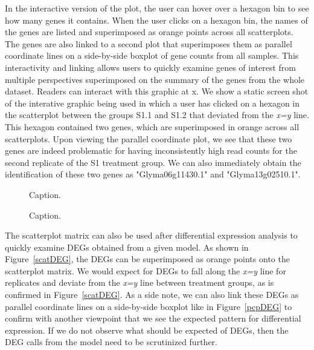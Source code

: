 \documentclass[useAMS,referee]{biom}
\begin{document}
In the interactive version of the plot, the user can hover over a hexagon bin to see how many genes it contains. When the user clicks on a hexagon bin, the names of the genes are listed and superimposed as orange points across all scatterplots. The genes are also linked to a second plot that superimposes them as parallel coordinate lines on a side-by-side boxplot of gene counts from all samples. This interactivity and linking allows users to quickly examine genes of interest from multiple perspectives superimposed on the summary of the genes from the whole dataset. Readers can interact with this graphic at x. We show a static screen shot of the interative graphic being used in which a user has clicked on a hexagon in the scatterplot between the groups S1.1 and S1.2 that deviated from the \textit{x=y} line. This hexagon contained two genes, which are superimposed in orange across all scatterplots. Upon viewing the parallel coordinate plot, we see that these two genes are indeed problematic for having inconsistently high read counts for the second replicate of the S1 treatment group. We can also immediately obtain the identification of these two genes as "Glyma06g11430.1" and "Glyma13g02510.1".

\begin{figure}
\begin{center}
\centerline{}
\end{center}
\caption{Caption.
\label{scatMat1}}
\end{figure}

\begin{figure}
\begin{center}
\centerline{}
\end{center}
\caption{Caption.
\label{scatMat2}}
\end{figure}

The scatterplot matrix can also be used after differential expression analysis to quickly examine DEGs obtained from a given model. As shown in Figure~\ref{scatDEG}, the DEGs can be superimposed as orange points onto the scatterplot matrix. We would expect for DEGs to fall along the \textit{x=y} line for replicates and deviate from the \textit{x=y} line between treatment groups, as is confirmed in Figure~\ref{scatDEG}. As a side note, we can also link these DEGs as parallel coordinate lines on a side-by-side boxplot like in Figure~\ref{pcpDEG} to confirm with another viewpoint that we see the expected pattern for differential expression. If we do not observe what should be expected of DEGs, then the DEG calls from the model need to be scrutinized further.
\end{document}
